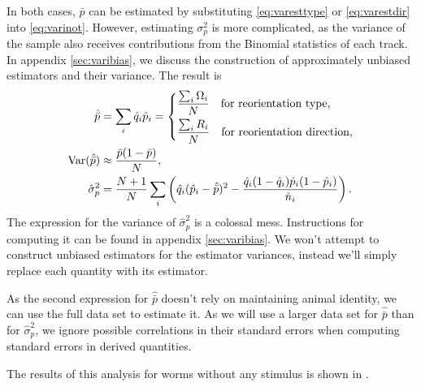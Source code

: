\documentclass[12pt]{article}
\begin{document}
In both cases, $\bar{p}$ can be estimated by substituting \eqref{eq:varesttype} or \eqref{eq:varestdir} into \eqref{eq:varinot}. However, estimating $\sigma_p^2$ is more complicated, as the variance of the sample also receives contributions from the Binomial statistics of each track. In appendix \ref{sec:varibias}, we discuss the construction of approximately unbiased estimators and their variance. The result is
%
\begin{equation}\label{eq:variests}
  \begin{aligned}
    \hat{\bar{p}} &= \sum_i \hat{q}_i \hat{p}_i
       =\left\{\begin{aligned}
      & \frac{\sum_i \Omega_i}{N} \quad \text{for reorientation type,}\\
      & \frac{\sum_i R_i}{N}  \quad \text{for reorientation direction,}
       \end{aligned}\right. \\
    \operatorname{Var}(\hat{\bar{p}}) &\approx \frac{\bar{p}(1-\bar{p})}{N},\\
    \hat{\sigma}_p^2 &= \frac{N+1}{N} \sum_i\left (  \hat{q}_i(\hat{p}_i-\hat{\bar{p}})^2 - \frac{\hat{q}_i(1-\hat{q}_i)\hat{p}_i(1-\hat{p}_i)}{\hat{n}_i} \right ).
  \end{aligned}
\end{equation}
%
The expression for the variance of $\hat{\sigma}_p^2$ is a colossal mess. Instructions for computing it can be found in appendix \ref{sec:varibias}. We won't attempt to construct unbiased estimators for the estimator variances, instead we'll simply replace each quantity with its estimator.

As the second expression for $\hat{\bar{p}}$ doesn't rely on maintaining animal identity, we can use the full data set to estimate it. As we will use a larger data set for $\hat{\bar{p}}$ than for $\hat{\sigma}_p^2$, we ignore possible correlations in their standard errors when computing standard errors in derived quantities.

The results of this analysis for worms without any stimulus is shown in .
\end{document}
